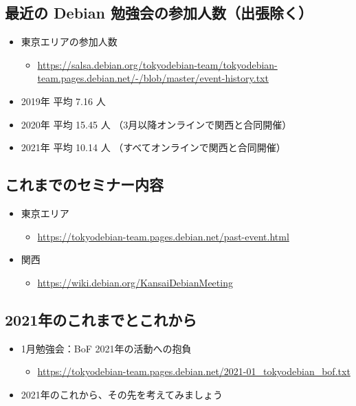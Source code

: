 \documentclass[mingoth,a4paper]{jsarticle}
\begin{document}

\subsection{最近の Debian 勉強会の参加人数（出張除く）}

\begin{itemize}
\item 東京エリアの参加人数
  \begin{itemize}
  \item \url{https://salsa.debian.org/tokyodebian-team/tokyodebian-team.pages.debian.net/-/blob/master/event-history.txt}
  \end{itemize}
\item 2019年 平均  7.16 人
\item 2020年 平均 15.45 人 （3月以降オンラインで関西と合同開催）
\item 2021年 平均 10.14 人 （すべてオンラインで関西と合同開催）
\end{itemize}


\subsection{これまでのセミナー内容}

\begin{itemize}
\item 東京エリア
  \begin{itemize}
  \item \url{https://tokyodebian-team.pages.debian.net/past-event.html}
  \end{itemize}
\item 関西
  \begin{itemize}
  \item \url{https://wiki.debian.org/KansaiDebianMeeting}
  \end{itemize}
\end{itemize}


\subsection{2021年のこれまでとこれから}

\begin{itemize}
\item 1月勉強会：BoF 2021年の活動への抱負
  \begin{itemize}
  \item \url{https://tokyodebian-team.pages.debian.net/2021-01_tokyodebian_bof.txt}
  \end{itemize}
\item 2021年のこれから、その先を考えてみましょう
\end{itemize}
\end{document}

